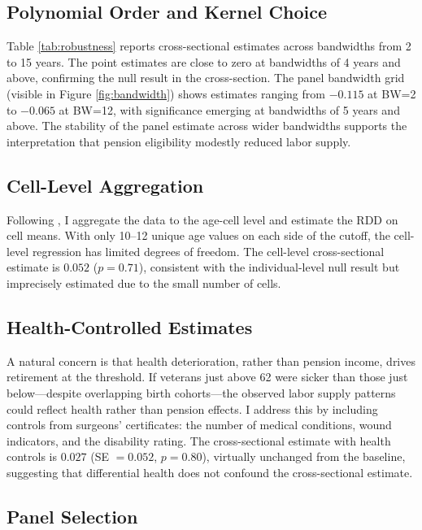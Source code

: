\documentclass[12pt]{article}
\begin{document}
\subsection{Polynomial Order and Kernel Choice}

Table \ref{tab:robustness} reports cross-sectional estimates across bandwidths from 2 to 15 years. The point estimates are close to zero at bandwidths of 4 years and above, confirming the null result in the cross-section. The panel bandwidth grid (visible in Figure \ref{fig:bandwidth}) shows estimates ranging from $-0.115$ at BW=2 to $-0.065$ at BW=12, with significance emerging at bandwidths of 5 years and above. The stability of the panel estimate across wider bandwidths supports the interpretation that pension eligibility modestly reduced labor supply.

\subsection{Cell-Level Aggregation}

Following \citet{lee2010regression}, I aggregate the data to the age-cell level and estimate the RDD on cell means. With only 10--12 unique age values on each side of the cutoff, the cell-level regression has limited degrees of freedom. The cell-level cross-sectional estimate is $0.052$ ($p = 0.71$), consistent with the individual-level null result but imprecisely estimated due to the small number of cells.

\subsection{Health-Controlled Estimates}

A natural concern is that health deterioration, rather than pension income, drives retirement at the threshold. If veterans just above 62 were sicker than those just below---despite overlapping birth cohorts---the observed labor supply patterns could reflect health rather than pension effects. I address this by including controls from surgeons' certificates: the number of medical conditions, wound indicators, and the disability rating. The cross-sectional estimate with health controls is $0.027$ (SE $= 0.052$, $p = 0.80$), virtually unchanged from the baseline, suggesting that differential health does not confound the cross-sectional estimate.

\subsection{Panel Selection}
\end{document}
